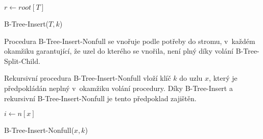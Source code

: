 \begin{algorithm}[t]
\SetAlgoLined
{}

$r\longleftarrow root[T]$

\caption{B-Tree-Insert($T,k$)}
\end{algorithm}

Procedura B-Tree-Insert-Nonfull se vnořuje podle potřeby do stromu,
v~každém okamžiku garantující, že uzel do kterého se vnořila, není
plný díky volání B-Tree-Split-Child\@.

Rekursivní procedura B-Tree-Insert-Nonfull vloží klíč $k$ do uzlu
$x$, který je předpokládán neplný v~okamžiku volání procedury\@.
Díky B-Tree-Insert a rekursivní B-Tree-Insert-Nonfull je tento předpoklad
zajištěn\@.

\begin{algorithm}[t]
\SetAlgoLined
{}

$i \longleftarrow n[x]$\\

\caption{B-Tree-Insert-Nonfull($x,k$)}
\end{algorithm}



